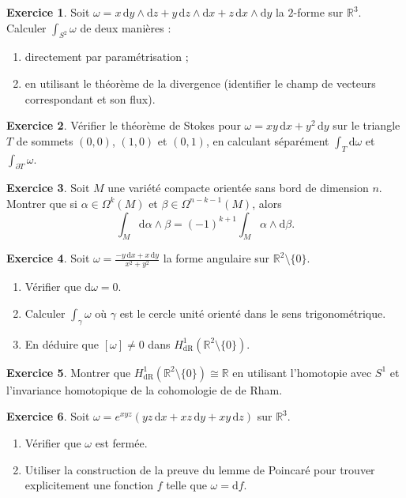 \documentclass[12pt,a4paper,openany]{book}
\theoremstyle{definition}
\newtheorem{exercice}{Exercice}[chapter]
\theoremstyle{plain}
\theoremstyle{remark}
\newcommand{\R}{\mathbb{R}}
\newcommand{\dd}{\mathrm{d}}
\begin{document}
\begin{exercice}\label{exo:stokes-1}
Soit $\omega = x\,\dd y \wedge \dd z + y\,\dd z \wedge \dd x + z\,\dd x
\wedge \dd y$ la $2$-forme sur $\R^3$. Calculer $\int_{S^2} \omega$ de deux
manières :
\begin{enumerate}[label=(\alph*)]
  \item directement par paramétrisation ;
  \item en utilisant le théorème de la divergence (identifier le champ
  de vecteurs correspondant et son flux).
\end{enumerate}
\end{exercice}

\begin{exercice}\label{exo:stokes-2}
Vérifier le théorème de Stokes pour $\omega = xy\,\dd x + y^2\,\dd y$ sur le
triangle $T$ de sommets $(0,0)$, $(1,0)$ et $(0,1)$, en calculant séparément
$\int_T \dd\omega$ et $\int_{\partial T} \omega$.
\end{exercice}

\begin{exercice}\label{exo:stokes-3}
Soit $M$ une variété compacte orientée sans bord de dimension $n$. Montrer que
si $\alpha \in \Omega^k(M)$ et $\beta \in \Omega^{n-k-1}(M)$, alors
\[
  \int_M \dd\alpha \wedge \beta = (-1)^{k+1} \int_M \alpha \wedge \dd\beta.
\]
\end{exercice}

\begin{exercice}\label{exo:stokes-4}
Soit $\omega = \frac{-y\,\dd x + x\,\dd y}{x^2 + y^2}$ la forme angulaire
sur $\R^2 \setminus \{0\}$.
\begin{enumerate}[label=(\alph*)]
  \item Vérifier que $\dd\omega = 0$.
  \item Calculer $\int_\gamma \omega$ où $\gamma$ est le cercle unité orienté
  dans le sens trigonométrique.
  \item En déduire que $[\omega] \neq 0$ dans
  $H^1_{\mathrm{dR}}(\R^2 \setminus \{0\})$.
\end{enumerate}
\end{exercice}

\begin{exercice}\label{exo:stokes-5}
Montrer que $H^1_{\mathrm{dR}}(\R^2 \setminus \{0\}) \cong \R$ en utilisant
l'homotopie avec $S^1$ et l'invariance homotopique de la cohomologie de
de Rham.
\end{exercice}

\begin{exercice}\label{exo:stokes-6}
Soit $\omega = e^{xyz}(yz\,\dd x + xz\,\dd y + xy\,\dd z)$ sur $\R^3$.
\begin{enumerate}[label=(\alph*)]
  \item Vérifier que $\omega$ est fermée.
  \item Utiliser la construction de la preuve du lemme de Poincaré pour
  trouver explicitement une fonction $f$ telle que $\omega = \dd f$.
\end{enumerate}
\end{exercice}
\end{document}
